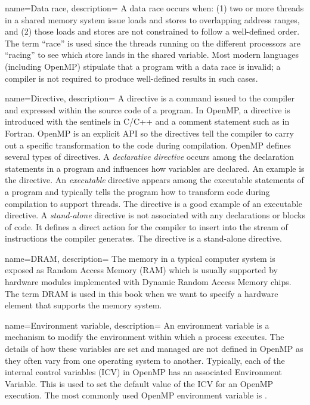 {
  name={Data race},
   description={
   A data race occurs when: (1) two or more threads in a shared memory system issue loads and stores to overlapping
   address ranges, and (2) those loads and stores are not constrained to follow a 
   well-defined 
   order.  The term ``race'' is used since
   the threads running on the different processors are ``racing'' to see which store lands in the shared variable.  Most modern
   languages (including OpenMP) stipulate that a  program with a data race is invalid; a compiler is not required
   to produce well-defined results in such cases.
      }
}

{
   name={Directive},
   description={
   A directive is a command issued to the compiler and expressed within the source code of a program.
   In OpenMP, a directive is introduced with the sentinels   in C/C++ and
   a comment statement such as  in Fortran.  OpenMP is an explicit API so the directives
   tell the compiler to carry out a specific transformation to the code during compilation.   OpenMP 
   defines several types of directives.  A \emph{declarative directive} occurs among the declaration statements
   in a program and influences how variables are declared.  An example is the  directive.
   An \emph{executable} directive appears among the executable statements of a program and typically tells
   the program how to transform code during compilation to support threads.  The  directive
   is a good example of an executable directive.  A \emph{stand-alone} directive is not associated with 
   any declarations or blocks of code.  It defines a direct action for the compiler to insert into the
   stream of instructions the compiler generates.  The  directive is a stand-alone directive.}
}

{
   name={DRAM},
   description={
   The memory in a typical computer system is exposed as Random Access Memory (RAM) which is
   usually supported by hardware modules implemented with Dynamic Random Access Memory chips.  The term
   DRAM is used in this book when we want to specify a hardware element that supports the memory system.
   }
}   


{
   name={Environment variable},
   description={
   An environment variable is a mechanism to modify the environment within which a process executes.
   The details of how these variables are set and managed are not defined in OpenMP as they often vary from
   one operating system to another.   Typically, each of the internal control variables (ICV) in OpenMP has an 
   associated Environment Variable. This is used to set the default value of the ICV for an OpenMP execution.
   The most commonly used OpenMP environment variable is .
   }
}   


